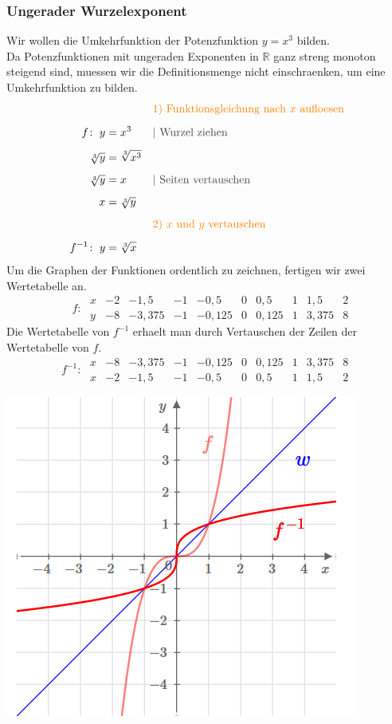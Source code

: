 \begin{multicols}{2}
    \subsubsection{Ungerader Wurzelexponent}
    \vspace{-4mm}
    Wir wollen die Umkehrfunktion der Potenzfunktion $y = x^3$ bilden. \\
    Da Potenzfunktionen mit ungeraden Exponenten in $\mathbb{R}$ ganz streng monoton steigend sind, muessen wir die Definitionsmenge nicht einschraenken, um eine Umkehrfunktion zu bilden.
    \begin{align*} & &&{\color{orange}\text{1) Funktionsgleichung nach $x$ aufloesen}} \\[5px] f\colon\; y &= x^3 &&{\color{darkgray}| \text{ Wurzel ziehen}} \\[5px] \sqrt[3]{y} &= \sqrt[3]{x^3} \\[5px] \sqrt[3]{y} &= x &&{\color{darkgray}| \text{ Seiten vertauschen}} \\[5px] x &= \sqrt[3]{y} \\[5px] & &&{\color{orange}\text{2) $x$ und $y$ vertauschen}} \\[5px] f^{-1}\colon\; y &= \sqrt[3]{x} \end{align*}
    Um die Graphen der Funktionen ordentlich zu zeichnen, fertigen wir zwei Wertetabelle an.
    \[\phantom{^{-1}}f\colon\; \begin{array}{r|c|c|c|c|c|c|c|c|c} x & -2 & -1{,}5 & -1 & -0{,}5 & 0 & 0{,}5 & 1 & 1{,}5 & 2 \\ \hline y & -8 & -3{,}375 & -1 & -0{,}125 & 0 & 0{,}125 & 1 & 3{,}375 & 8 \end{array}\]
    Die Wertetabelle von $f^{-1}$ erhaelt man durch Vertauschen der Zeilen der Wertetabelle von $f$.
    \[f^{-1}\colon\; \begin{array}{r|c|c|c|c|c|c|c|c|c} x & -8 & -3{,}375 & -1 & -0{,}125 & 0 & 0{,}125 & 1 & 3{,}375 & 8 \\ \hline x & -2 & -1{,}5 & -1 & -0{,}5 & 0 & 0{,}5 & 1 & 1{,}5 & 2 \end{array}\]
    \begin{center}
        \includegraphics[scale=0.7]{wurzelfunktion3}
    \end{center}

\end{multicols}